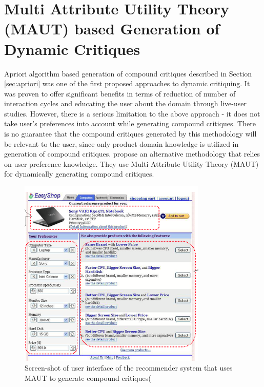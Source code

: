 \section{Multi Attribute Utility Theory (MAUT) based Generation of Dynamic Critiques}
\label{sec:maut}
Apriori algorithm based generation of compound critiques described in Section \ref{sec:apriori} was one of the first proposed approaches to dynamic critiquing.
It was proven to offer significant benefits in terms of reduction of number of interaction cycles and educating the user about the domain through live-user studies.
However, there is a serious limitation to the above approach - it does not take user's preferences into account while generating compound critiques.
There is no guarantee that the compound critiques generated by this methodology will be relevant to the user, since only product domain knowledge is utilized in generation of compound critiques.
\cite{mautPaper} propose an alternative methodology that relies on user preference knowledge.
They use Multi Attribute Utility Theory (MAUT) for dynamically generating compound critiques.
\begin{figure}
  \centering
    \includegraphics[width=0.8\textwidth]{figures-bharath/maut.png}
  \caption{Screen-shot of user interface of the recommender system that uses MAUT to generate compound critiques(\cite{mautPaper}}
\label{fig:maut}
\end{figure}



